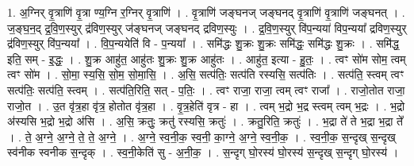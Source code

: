 \documentclass[17pt]{extarticle}
\begin{document}
1. अ॒ग्निर् वृ॒त्राणि॑ वृ॒त्रा ण्य॒ग्नि र॒ग्निर् वृ॒त्राणि॑ । . वृ॒त्राणि॑ जङ्घनज् जङ्घनद् वृ॒त्राणि॑ वृ॒त्राणि॑ जङ्घनत् । . ज॒ङ्घ॒न॒द् द्र॒वि॒ण॒स्युर् द्र॑विण॒स्युर् ज॑ङ्घनज् जङ्घनद् द्रविण॒स्युः । . द्र॒वि॒ण॒स्युर् वि॑प॒न्यया॑ विप॒न्यया᳚ द्रविण॒स्युर् द्र॑विण॒स्युर् वि॑प॒न्यया᳚ । . वि॒प॒न्ययेति॑ वि - प॒न्यया᳚ । . समि॑द्धः शु॒क्रः शु॒क्रः समि॑द्धः॒ समि॑द्धः शु॒क्रः । . समि॑द्ध॒ इति॒ सम् - इ॒द्धः॒ । . शु॒क्र आहु॑त॒ आहु॑तः शु॒क्रः शु॒क्र आहु॑तः । . आहु॑त॒ इत्या - हु॒तः॒ । . त्वꣳ सो॑म सोम॒ त्वम् त्वꣳ सो॑म । . सो॒मा॒ स्य॒सि॒ सो॒म॒ सो॒मा॒सि॒ । . अ॒सि॒ सत्प॑तिः॒ सत्प॑ति रस्यसि॒ सत्प॑तिः । . सत्प॑ति॒ स्त्वम् त्वꣳ सत्प॑तिः॒ सत्प॑ति॒ स्त्वम् । . सत्प॑ति॒रिति॒ सत् - प॒तिः॒ । . त्वꣳ राजा॒ राजा॒ त्वम् त्वꣳ राजा᳚ । . राजो॒तोत राजा॒ राजो॒त । . उ॒त वृ॑त्र॒हा वृ॑त्र॒ होतोत वृ॑त्र॒हा । . वृ॒त्र॒हेति॑ वृत्र - हा । . त्वम् भ॒द्रो भ॒द्र स्त्वम् त्वम् भ॒द्रः । . भ॒द्रो अ॑स्यसि भ॒द्रो भ॒द्रो अ॑सि । . अ॒सि॒ क्रतुः॒ क्रतु॑ रस्यसि॒ क्रतुः॑ । . क्रतु॒रिति॒ क्रतुः॑ । . भ॒द्रा ते॑ ते भ॒द्रा भ॒द्रा ते᳚ । . ते॒ अ॒ग्ने॒ अ॒ग्ने॒ ते॒ ते॒ अ॒ग्ने॒ । . अ॒ग्ने॒ स्व॒नी॒क॒ स्व॒नी॒ का॒ग्ने॒ अ॒ग्ने॒ स्व॒नी॒क॒ । . स्व॒नी॒क॒ स॒न्दृख् स॒न्दृख् स्व॑नीक स्वनीक स॒न्दृक् । . स्व॒नी॒केति॑ सु - अ॒नी॒क॒ । . स॒न्दृग् घो॒रस्य॑ घो॒रस्य॑ स॒न्दृख् स॒न्दृग् घो॒रस्य॑ । \newline
\end{document}
